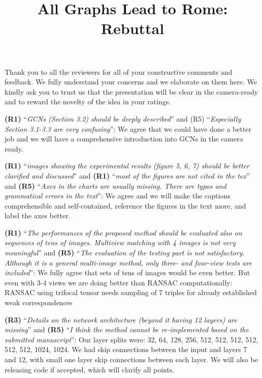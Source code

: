 \documentclass[10pt,twocolumn,letterpaper]{article}
\begin{document}
\title{All Graphs Lead to Rome: Rebuttal}  %

\maketitle
\thispagestyle{empty}

Thank you to all the reviewers for all of your constructive comments and feedback.
We fully understand your concerns and we elaborate on them here.
We kindly ask you to trust us that the presentation will be clear in
the camera-ready and to reward the novelty of the idea in your ratings.

\textbf{(R1)} ``\textit{GCNs (Section 3.2) should be deeply described}'' and (R5) ``\textit{Especially Section 3.1-3.3 are very confusing}'':
We agree that we could have done a better job and we will have a comprehensive introduction into GCNs in the camera ready.

\textbf{(R1)} ``\textit{images showing the experimental results (figure 5, 6, 7) should be better clarified and discussed}'' and 
\textbf{(R1)} ``\textit{most of the figures are not cited in the tex}'' and
\textbf{(R5)} ``\textit{Axes in the charts are usually missing. There are typos and grammatical errors in the text}'':
We agree and we will make the captions comprehensible and self-contained, reference the figures in the text more, and label the axes better.

\textbf{(R1)} ``\textit{The performances of the proposed method should be evaluated also on sequences of tens of images. Multiview matching with 4 images is not very meaningful}'' and 
\textbf{(R5)} ``\textit{The evaluation of the testing part is not satisfactory. Although it is a general multi-image method, only three- and four-view tests are included}'':
We fully agree that sets of tens of images would be even better.  But even with 3-4 views we are doing better than RANSAC computationally: RANSAC using trifocal tensor needs sampling of 7 triples for already established weak correspondences

\textbf{(R3)} ``\textit{Details on the network architecture (beyond it having 12 layers) are missing}'' and 
\textbf{(R5)} ``\textit{I think the method cannot be re-implemented based on the submitted manuscript}'':
Our layer splits were: 32, 64, 128, 256, 512, 512, 512, 512, 512, 512, 1024, 1024. We had skip connections between the input and layers 7 and 12, with small one layer skip connections between each layer. We will also be releasing code if accepted, which will clarify all points.
\end{document}
